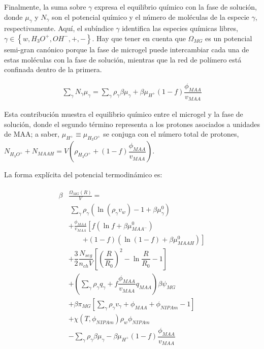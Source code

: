 Finalmente, la suma sobre  $\gamma$ expresa el equilibrio qu\'imico con la fase de soluci\'on, donde $\mu_\gamma$ y $N_\gamma$ son el potencial qu\'imico y el n\'umero de mol\'eculas de la especie $\gamma$, respectivamente.
Aqu\'i, el subíndice $\gamma$ identifica  las especies qu\'imicas libres, $\gamma \in \left\{ w, H_3O^+, OH^-, +,- \right\}$.
Hay que tener en cuenta que $\Omega_{MG}$ es un potencial semi-gran can\'onico porque la fase de microgel puede intercambiar cada una de estas mol\'eculas con la fase de soluci\'on, mientras que la red de pol\'imero está confinada dentro de la primera.


\begin{align}
	\sum_\gamma N_\gamma \mu_\gamma = \sum_{\gamma }{\rho_\gamma\beta\mu_\gamma}
	+ \beta\mu_{H^+}(1-f)\dfrac{\phi_{MAA}}{v_{MAA}}
\end{align}

Esta contribuci\'on muestra el equilibrio qu\'imico entre el microgel y la fase de soluci\'on, donde el segundo t\'ermino representa a los protones asociados a unidades de MAA;
a saber, $\mu_{H^+}\equiv\mu_{H_3O^+}$ se conjuga con el n\'umero total de protones,
$N_{H_3O^+}+N_{MAAH}=V\left(\rho_{H_3O^+}+(1-f)\dfrac{\phi_{MAA}}{v_{MAA}}\right)$.


La forma expl\'icita del potencial termodin\'amico es:




%
\begin{align}
\begin{aligned}
\beta&\frac{\Omega_{MG}(R)}{V}=\\& ~ \sum_{\gamma} \rho_\gamma\left(\ln\left(\rho_\gamma v_w\right) -1 + \beta\mu^0_\gamma\right) \\
& + \frac{\phi_{MAA}}{v_{MAA}} \left[f(\ln f+ \beta\mu^0_{MAA^-})\right.\\
&\qquad\left.+(1-f)(\ln (1-f)+\beta\mu^0_{MAAH})\right] \\
%
& + \dfrac{3}{2}\dfrac{N_{seg}}{n_{ch} V}\left[\left(\dfrac{R}{R_0}\right)^2 - \ln\dfrac{R}{R_0} -1\right] \\
%
& +  \left(\sum_{\gamma } {\rho_\gamma q_\gamma + f\dfrac{\phi_{MAA}}{v_{MAA}}q_{MAA}}\right)\beta\psi_{MG}\\
%
& +\beta\pi_{MG} \left[ \sum_{\gamma } \rho_\gamma v_\gamma  + \phi_{MAA} + \phi_{NIPAm} -1 \right] \\
%
& + \chi (T, \phi_{NIPAm})\rho_w \phi_{NIPAm} \\
%
& -\sum_{\gamma }{\rho_\gamma\beta\mu_\gamma}
 -\beta\mu_{H^+}(1-f)\dfrac{\phi_{MAA}}{v_{MAA}}\\
%
%
\end{aligned}
\label{eq:gel:free-energy}
\end{align}




